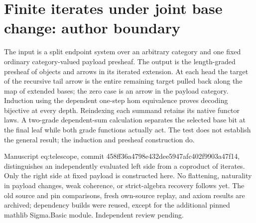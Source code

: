 \documentclass{article}
\begin{document}
\section*{Finite iterates under joint base change: author boundary}
The input is a split endpoint system over an arbitrary category and one fixed ordinary category-valued payload presheaf. The output is the length-graded presheaf of objects and arrows in its iterated extension. At each head the target of the recursive tail arrow is the entire remaining target pulled back along the map of extended bases; the zero case is an arrow in the payload category. Induction using the dependent one-step hom equivalence proves decoding bijective at every depth. Reindexing each summand retains its native functor laws. A two-grade dependent-sum calculation separates the selected base bit at the final leaf while both grade functions actually act. The test does not establish the general result; the induction and presheaf construction do.

Manuscript eq:telescope, commit 458ff36a4798e432dee5947afc402f9903a47f14, distinguishes an independently evaluated left side from a coproduct of iterates. Only the right side at fixed payload is constructed here. No flattening, naturality in payload changes, weak coherence, or strict-algebra recovery follows yet. The old source and pin comparisons, fresh own-source replay, and axiom results are archived; dependency builds were reused, except for the additional pinned mathlib Sigma.Basic module. Independent review pending.
\end{document}
